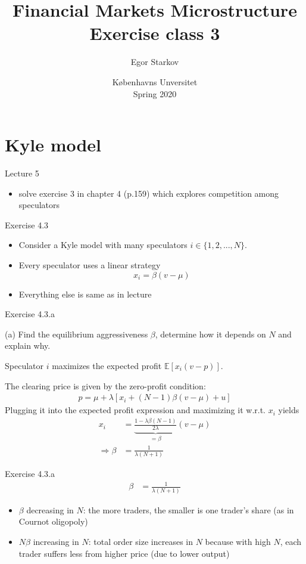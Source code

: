\documentclass[english,10pt,aspectratio=169]{beamer}
\title{Financial Markets Microstructure \\ Exercise class 3}
\author{Egor Starkov}
\date{K{\o}benhavns Unversitet \\
	Spring 2020}
\begin{document}
\frame[plain]{\titlepage}
\addtocounter{framenumber}{-1}



\section{Kyle model}

\begin{frame}{Lecture 5}
	\begin{itemize}
		\item solve exercise 3 in chapter 4 (p.159) which explores competition among speculators
	\end{itemize}
\end{frame}


\begin{frame}{Exercise 4.3}
	\begin{itemize}
		\item Consider a Kyle model with many speculators $i \in \{1,2,...,N\}$.
		\item Every speculator uses a linear strategy
		$$ x_i = \beta (v-\mu) $$
		\item Everything else is same as in lecture
	\end{itemize}
\end{frame}


\begin{frame}{Exercise 4.3.a}
	\begin{exampleblock}{}
		(a) Find the equilibrium aggressiveness $\beta$, determine how it depends on $N$ and explain why.
	\end{exampleblock}
	
	\pause
	
	Speculator $i$ maximizes the expected profit $\mathbb{E} [x_i (v-p)]$.
	
	The clearing price is given by the zero-profit condition:
	\begin{align*}
		p = \mu + \lambda [x_i + (N-1) \beta (v-\mu) + u]
	\end{align*}
	Plugging it into the expected profit expression and maximizing it w.r.t. $x_i$ yields
	\begin{align*}
		x_i &= \underbrace{\frac{1 - \lambda \beta (N-1)}{2 \lambda}}_{=\beta} (v-\mu)
		\\
		\Rightarrow
		\beta &= \frac{1}{\lambda (N+1)}
	\end{align*}
\end{frame}


\begin{frame}{Exercise 4.3.a}
	\begin{align*}
	\beta &= \frac{1}{\lambda (N+1)}
	\end{align*}
	
	\begin{itemize}
		\item $\beta$ decreasing in $N$: the more traders, the smaller is one trader's share (as in Cournot oligopoly)
		\item $N \beta$ increasing in $N$: total order size increases in $N$ because with high $N$, each trader suffers less from higher price (due to lower output)
	\end{itemize}
\end{frame}
\end{document}
